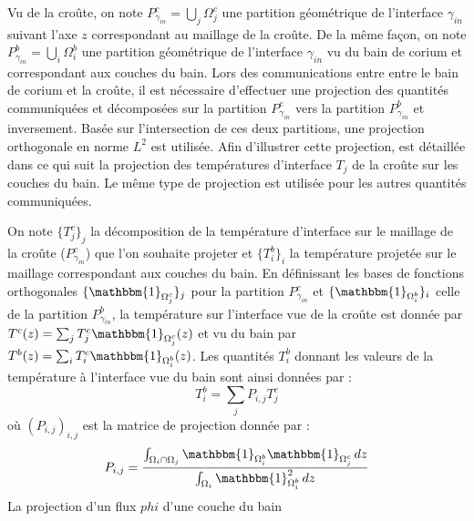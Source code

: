 Vu de la croûte, on note $P_{\gamma_{in}}^{c}=\displaystyle{\bigcup_j} \Omega_j^c$ une partition géométrique de l'interface $\gamma_{in}$ suivant l'axe $z$ correspondant au maillage de la croûte. De la même façon, on note $P_{\gamma_{in}}^{b}=\displaystyle{\bigcup_i} \Omega_i^b$ une partition géométrique de l'interface $\gamma_{in}$ vu du bain de corium et correspondant aux couches du bain. Lors des communications entre entre le bain de corium et la croûte, il est nécessaire d'effectuer une projection des quantités communiquées et décomposées sur la partition $P_{\gamma_{in}}^{c}$ vers la partition $P_{\gamma_{in}}^{b}$ et inversement. Basée sur l'intersection de ces deux partitions, une projection orthogonale en norme $L^2$ est utilisée. Afin d'illustrer cette projection, est détaillée dans ce qui suit la projection des températures d'interface $T_j$ de la croûte sur les couches du bain. Le même type de projection est utilisée pour les autres quantités communiquées.

On note $\{T_j^c\}_j$ la décomposition de la température d'interface sur le maillage de la croûte ($P_{\gamma_{in}}^{c}$) que l'on souhaite projeter et $\{T_i^b\}_i$ la température projetée sur le maillage correspondant aux couches du bain. En définissant les bases de fonctions orthogonales $\{{\mathbbm{1}}_{\Omega_j^c}\}_j$ pour la partition $P_{\gamma_{in}}^{c}$ et  $\{{\mathbbm{1}}_{\Omega_i^b}\}_i$ celle de la partition $P_{\gamma{_{in}}}^{b}$, la température sur l'interface vue de la croûte est donnée par $T^c(z)=\sum_j {T_j^c {\mathbbm{1}}_{\Omega_j^c}(z)}$ et vu du bain par  $T^b(z)=\sum_i {T_i^c {\mathbbm{1}}_{\Omega_i^b}(z)}$. Les quantités $T_i^b$ donnant les valeurs de la température à l'interface vue du bain sont ainsi données par : $$T_i^b=\sum_j P_{i,j} T_j^c$$ où $\left(P_{i,j}\right)_{i,j}$ est la matrice de projection donnée par : $$P_{i,j}=\frac{\int_{\Omega_i\cap\Omega_j}{\mathbbm{1}}_{\Omega_i^b}{\mathbbm{1}}_{\Omega_j^c}\, dz}{ \int_{\Omega_i}{\mathbbm{1}}_{\Omega_i^b}^2\, dz}$$La projection d'un flux $phi$ d'une couche du bain 
